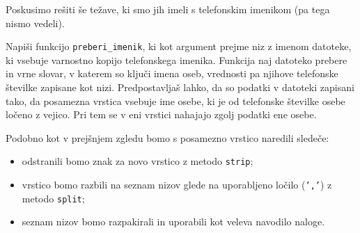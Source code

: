 Poskusimo rešiti še težave, ki smo jih imeli s telefonskim imenikom (pa tega nismo vedeli).
\begin{zgled}
Napiši funkcijo \texttt{preberi\_imenik}, ki kot argument prejme niz z imenom datoteke, ki vsebuje varnostno kopijo telefonskega imenika. Funkcija naj datoteko prebere in vrne slovar, v katerem so ključi imena oseb, vrednosti pa njihove telefonske številke zapisane kot nizi. Predpostavljaš lahko, da so podatki v datoteki zapisani tako, da posamezna vrstica vsebuje ime osebe, ki je od telefonske številke osebe ločeno z vejico. Pri tem se v eni vrstici nahajajo zgolj podatki ene osebe.
\end{zgled}
\begin{resitev}
Podobno kot v prejšnjem zgledu bomo s posamezno vrstico naredili sledeče:
\begin{itemize}
    \item odstranili bomo znak za novo vrstico z metodo \texttt{strip};
    \item vrstico bomo razbili na seznam nizov glede na uporabljeno ločilo (\texttt{','}) z metodo \texttt{split};
    \item seznam nizov bomo razpakirali in uporabili kot veleva navodilo naloge.
\end{itemize}


\end{resitev}
